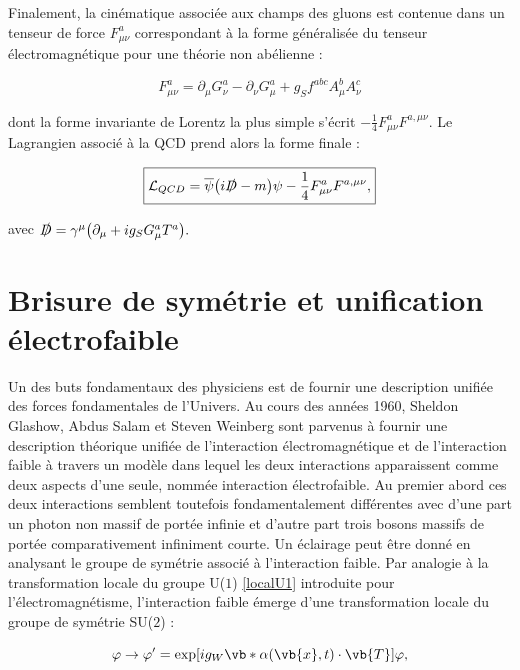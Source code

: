     Finalement, la cinématique associée aux champs des gluons est contenue dans un tenseur de force $F^a_{\mu\nu}$ correspondant à la forme généralisée du tenseur électromagnétique pour une théorie non abélienne :

    \begin{equation}
        F^a_{\mu\nu}=\partial_{\mu}G^a_{\nu}-\partial_{\nu}G^a_{\mu}+g_Sf^{abc}A_{\mu}^bA_{\nu}^c
    \end{equation}

    dont la forme invariante de Lorentz la plus simple s'écrit $-\frac{1}{4}F^a_{\mu\nu}F^{a,\mu\nu}$. Le Lagrangien associé à la QCD prend alors la forme finale :

    \begin{equation}
    \boxed{
        \mathcal{L}_{\tiny QCD}=\overline{\psi}\bigl(i\slashed{D}-m\bigr)\psi - \frac{1}{4}F^a_{\mu\nu}F^{a,\mu\nu},
    }
    \end{equation}

    avec $\slashed D = \gamma^{\mu}\bigl(\partial_{\mu}+ig_SG^a_{\mu}T^a\bigr).$
    
    \section{Brisure de symétrie et unification électrofaible}
    \label{EWK}

    Un des buts fondamentaux des physiciens est de fournir une description unifiée des forces fondamentales de l'Univers. Au cours des années 1960, Sheldon Glashow, Abdus Salam et Steven Weinberg sont parvenus à fournir une description théorique unifiée de l'interaction électromagnétique et de l'interaction faible à travers un modèle dans lequel les deux interactions apparaissent comme deux aspects d'une seule, nommée interaction électrofaible. Au premier abord ces deux interactions semblent toutefois fondamentalement différentes avec d'une part un photon non massif de portée infinie et d'autre part trois bosons massifs de portée comparativement infiniment courte. Un éclairage peut être donné en analysant le groupe de symétrie associé à l'interaction faible. Par analogie à la transformation locale du groupe U($1$) \ref{localU1} introduite pour l'électromagnétisme, l'interaction faible émerge d'une transformation locale du groupe de symétrie SU($2$) :

    \begin{equation}
        \varphi\rightarrow\varphi'=\exp[ig_{W}\vb*{\alpha}(\vb{x},t)\cdot\vb{T}]\varphi,
    \label{localSU2}
    \end{equation}

